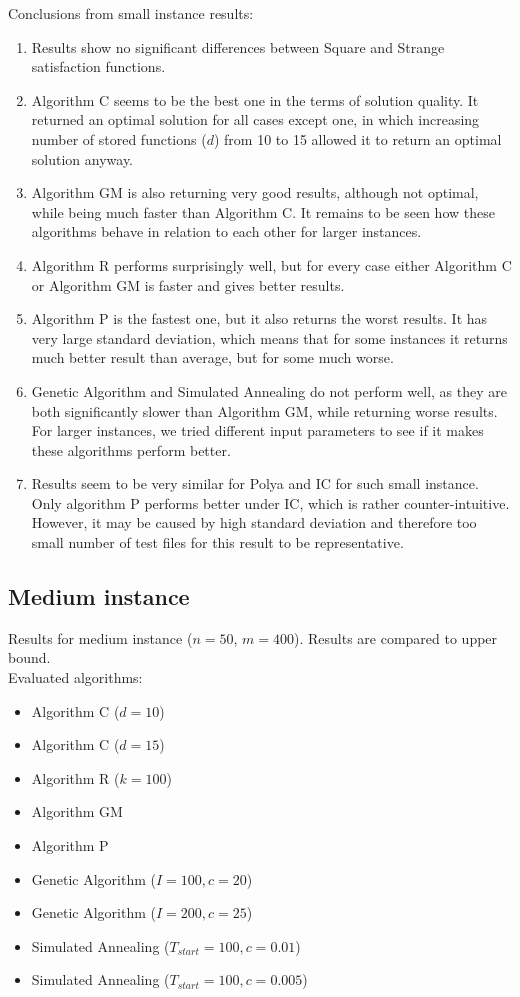 Conclusions from small instance results:
\begin{enumerate}
	\item Results show no significant differences between Square and Strange satisfaction functions.
	\item Algorithm C seems to be the best one in the terms of solution quality. It returned an optimal solution for all cases except one, in which increasing number of stored functions ($d$) from 10 to 15 allowed it to return an optimal solution anyway.
	\item Algorithm GM is also returning very good results, although not optimal, while being much faster than Algorithm C. It remains to be seen how these algorithms behave in relation to each other for larger instances.
	\item Algorithm R performs surprisingly well, but for every case either Algorithm C or Algorithm GM is faster and gives better results.
	\item Algorithm P is the fastest one, but it also returns the worst results. It has very large standard deviation, which means that for some instances it returns much better result than average, but for some much worse.
	\item Genetic Algorithm and Simulated Annealing do not perform well, as they are both significantly slower than Algorithm GM, while returning worse results. For larger instances, we tried different input parameters to see if it makes these algorithms perform better.
	\item Results seem to be very similar for Polya and IC for such small instance. Only algorithm P performs better under IC, which is rather counter-intuitive. However, it may be caused by high standard deviation and therefore too small number of test files for this result to be representative.
\end{enumerate}

\subsection{Medium instance}

Results for medium instance ($n = 50$, $m = 400$). Results are compared to upper bound.
\\

Evaluated algorithms:
\begin{itemize}
	\item Algorithm C ($d = 10$)
	\item Algorithm C ($d = 15$)
	\item Algorithm R ($k = 100$)
	\item Algorithm GM
	\item Algorithm P
	\item Genetic Algorithm ($I = 100, c = 20$)
	\item Genetic Algorithm ($I = 200, c = 25$)
	\item Simulated Annealing ($T_{start} = 100, c = 0.01$)
	\item Simulated Annealing ($T_{start} = 100, c = 0.005$)
\end{itemize}

